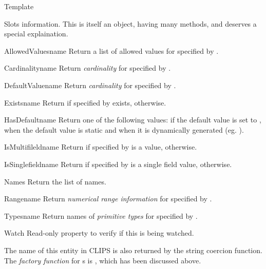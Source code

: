 \begin{classdesc*}{Template}
\begin{memberdesc}[property]{Slots}
  information. This is itself an
object, having many methods, and deserves a special explaination.
\begin{methoddesc}{AllowedValues}{name}
Return a list of allowed values for  specified by .
\end{methoddesc}
\begin{methoddesc}{Cardinality}{name}
Return \emph{cardinality} for  specified by .
\end{methoddesc}
\begin{methoddesc}{DefaultValue}{name}
Return \emph{cardinality} for  specified by .
\end{methoddesc}
\begin{methoddesc}{Exists}{name}
Return  if  specified by  exists,
 otherwise.
\end{methoddesc}
\begin{methoddesc}{HasDefault}{name}
Return one of the following values:  if the
default value is set to ,  when
the default value is static and  when it
is dynamically generated (eg. ).
\end{methoddesc}
\begin{methoddesc}{IsMultifileld}{name}
Return  if  specified by  is
a  value,  otherwise.
\end{methoddesc}
\begin{methoddesc}{IsSinglefield}{name}
Return  if  specified by  is
a single field value,  otherwise.
\end{methoddesc}
\begin{methoddesc}{Names}{}
Return the list of  names.
\end{methoddesc}
\begin{methoddesc}{Range}{name}
Return \emph{numerical range information} for  specified by
.
\end{methoddesc}
\begin{methoddesc}{Types}{name}
Return names of \emph{primitive types} for  specified by
.
\end{methoddesc}
\end{memberdesc}

\begin{memberdesc}[property]{Watch}
Read-only property to verify if this  is being watched.
\end{memberdesc}

The name of this entity in CLIPS is also returned by the string coercion
function. The \emph{factory function} for s is
, which has been discussed above.

\end{classdesc*}




